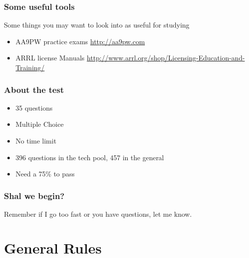 \documentclass[12pt,letterpaper]{beamer}
\begin{document}
\begin{frame}
\frametitle{Some useful tools}
Some things you may want to look into as useful for studying
\begin{itemize}
\item AA9PW practice exams \url{http://aa9pw.com}
\item ARRL license Manuals \url{http://www.arrl.org/shop/Licensing-Education-and-Training/}
\end{itemize}
\end{frame}

\begin{frame}
\frametitle{About the test}
\begin{itemize}
\item 35 questions \pause
\item Multiple Choice \pause
\item No time limit \pause
\item 396 questions in the tech pool, 457 in the general \pause
\item Need a 75\% to pass
\end{itemize}
\end{frame}

\begin{frame}
\frametitle{Shal we begin?}
Remember if I go too fast or you have questions, let me know.
\end{frame}

\section{General Rules}
\end{document}
